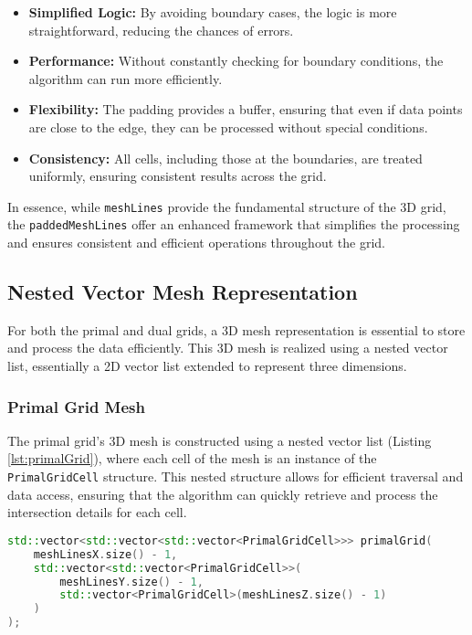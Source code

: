 \begin{itemize}
    \item \textbf{Simplified Logic:} By avoiding boundary cases, the logic is more straightforward, reducing the chances of errors.
    \item \textbf{Performance:} Without constantly checking for boundary conditions, the algorithm can run more efficiently.
    \item \textbf{Flexibility:} The padding provides a buffer, ensuring that even if data points are close to the edge, they can be processed without special conditions.
    \item \textbf{Consistency:} All cells, including those at the boundaries, are treated uniformly, ensuring consistent results across the grid.
\end{itemize}

In essence, while \texttt{meshLines} provide the fundamental structure of the 3D grid, the \texttt{paddedMeshLines} offer an enhanced framework that simplifies the processing and ensures consistent and efficient operations throughout the grid.

\subsection{Nested Vector Mesh Representation}

For both the primal and dual grids, a 3D mesh representation is essential to store and process the data efficiently. This 3D mesh is realized using a nested vector list, essentially a 2D vector list extended to represent three dimensions.

\subsubsection{Primal Grid Mesh} \label{Primal-Grid-Mesh}

The primal grid's 3D mesh is constructed using a nested vector list (Listing \ref{lst:primalGrid}), where each cell of the mesh is an instance of the \texttt{PrimalGridCell} structure. This nested structure allows for efficient traversal and data access, ensuring that the algorithm can quickly retrieve and process the intersection details for each cell.

\vspace{1mm}
\begin{lstlisting}[language=C++, caption=3D Mesh Representation Using Primal Grid Cells, label=lst:primalGrid]
std::vector<std::vector<std::vector<PrimalGridCell>>> primalGrid(
    meshLinesX.size() - 1,
    std::vector<std::vector<PrimalGridCell>>(
        meshLinesY.size() - 1, 
        std::vector<PrimalGridCell>(meshLinesZ.size() - 1)
    )
);
\end{lstlisting}

